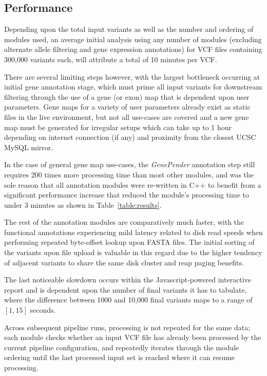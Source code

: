 \subsection{Performance}



Depending upon the total input variants as well as the number and ordering of modules used, an average initial analysis using any number of modules (excluding alternate allele filtering and gene expression annotations) for VCF files containing 300,000 variants each, will attribute a total of 10 minutes per VCF.

There are several limiting steps however, with the largest bottleneck occurring at initial gene annotation stage, which must prime all input variants for downstream filtering through the use of a gene (or exon) map that is dependent upon user parameters. Gene maps for a variety of user parameters already exist as static files in the live environment, but not all use-cases are covered and a new gene map must be generated for irregular setups which can take up to 1 hour depending on internet connection (if any) and proximity from the closest UCSC MySQL mirror.

In the case of general gene map use-cases, the \textit{GenePender} annotation step still requires 200 times more processing time than most other modules, and was the sole reason that all annotation modules were re-written in C++ to benefit from a significant performance increase that reduced the module's processing time to under 3 minutes as shown in Table~\ref{table:results}. 

The rest of the annotation modules are comparatively much faster, with the functional annotations experiencing mild latency related to disk read speeds when performing repeated byte-offset lookup upon FASTA files. The initial sorting of the variants upon file upload is valuable in this regard due to the higher tendency of adjacent variants to share the same disk cluster and reap paging benefits.

The last noticeable slowdown occurs within the Javascript-powered interactive report and is dependent upon the number of final variants it has to tabulate, where the difference between 1000 and 10,000 final variants maps to a range of $[1,15]$ seconds.

Across subsequent pipeline runs, processing is not repeated for the same data; each module checks whether an input VCF file has already been processed by the current pipeline configuration, and repeatedly iterates through the module ordering until the last processed input set is reached where it can resume processing.




